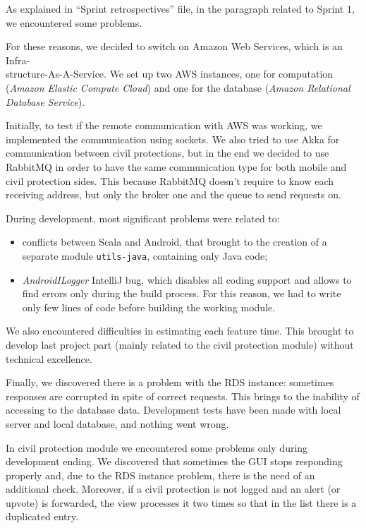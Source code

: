 \documentclass[a4paper,12pt]{report}
\begin{document}

As explained in ``Sprint retrospectives'' file, in the paragraph related to Sprint 1, we encountered some problems.

For these reasons, we decided to switch on Amazon Web Services, which is an Infra-\\structure-As-A-Service. We set up two AWS instances, one for computation (\textit{Amazon Elastic Compute Cloud}) and one for the database (\textit{Amazon Relational Database Service}).

Initially, to test if the remote communication with AWS was working, we implemented the communication using sockets. We also tried to use Akka for communication between civil protections, but in the end we decided to use RabbitMQ in order to have the same communication type for both mobile and civil protection sides. This because RabbitMQ doesn't require to know each receiving address, but only the broker one and the queue to send requests on.

During development, most significant problems were related to:

\begin{itemize}
\item conflicts between Scala and Android, that brought to the creation of a separate module \texttt{utils-java}, containing only Java code;
\item \textit{AndroidILogger} IntelliJ bug, which disables all coding support and allows to find errors only during the build process. For this reason, we had to write only few lines of code before building the working module.
\end{itemize}

We also encountered difficulties in estimating each feature time. This brought to develop last project part (mainly related to the civil protection module) without technical excellence.

Finally, we discovered there is a problem with the RDS instance: sometimes responses are corrupted in spite of correct requests. This brings to the inability of accessing to the database data.
Development tests have been made with local server and local database, and nothing went wrong.

In civil protection module we encountered some problems only during development ending. We discovered that sometimes the GUI stops responding properly and, due to the RDS instance problem, there is the need of an additional check.
Moreover, if a civil protection is not logged and an alert (or upvote) is forwarded, the view processes it two times so that in the list there is a duplicated entry. 
\end{document}
